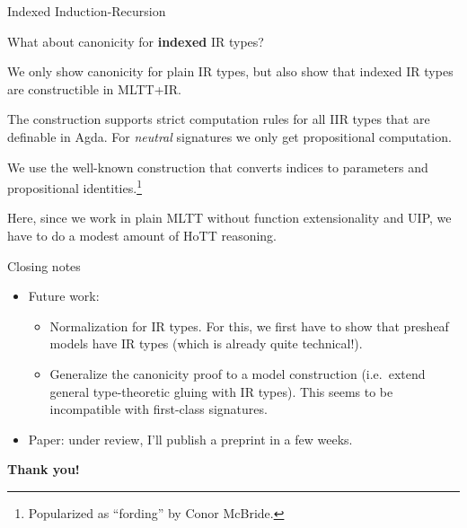 \documentclass[dvipsnames,aspectratio=169]{beamer}
\begin{document}
\begin{frame}{Indexed Induction-Recursion}

What about canonicity for \textbf{indexed} IR types?
\vspace{1em}

We only show canonicity for plain IR types, but also show that indexed IR types are
constructible in MLTT+IR.
\vspace{1em}

The construction supports strict computation rules for all IIR types that
are definable in Agda. For \emph{neutral} signatures we only get propositional computation.

\vspace{1em}
We use the well-known construction that converts indices to parameters and propositional identities.\footnote{Popularized as ``fording'' by Conor McBride.}

\vspace{1em}
Here, since we work in plain MLTT without function extensionality and UIP, we have to do a modest amount of HoTT reasoning.

\end{frame}

\begin{frame}{Closing notes}

\vspace{-1em}
\begin{itemize}
\item Future work:
  \begin{itemize}
    \item Normalization for IR types. For this, we first have to show that presheaf models have IR types (which is already quite technical!).
    \item Generalize the canonicity proof to a model construction (i.e.\ extend general type-theoretic gluing with IR types). This seems to
          be incompatible with first-class signatures.
  \end{itemize}
\item Paper: under review, I'll publish a preprint in a few weeks.
\end{itemize}
\vspace{3em}
\pause

\begin{center}
  \Large{\textbf{Thank you!}}
\end{center}
\end{frame}



\end{document}
